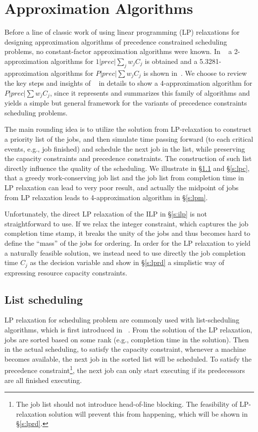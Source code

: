 \section{Approximation Algorithms} \label{s:lpr}

Before a line of classic work of using linear programming (LP) relaxations for designing approximation algorithms of precedence constrained scheduling problems, no constant-factor approximation algorithms were known. In ~\cite{schulz1996scheduling} a 2-approximation algorithms for $1|prec|\sum_j w_jC_j$ is obtained and a 5.3281-approximation algorithms for $P|prec|\sum w_jC_j$ is shown in~\cite{chakrabarti1996improved}. We choose to review the key steps and insights of ~\cite{queyranne2006approximation} in details to show a 4-approximation algorithm for $P|prec|\sum w_jC_j$, since it represents and summarizes this family of algorithms and yields a simple but general framework for the variants of precedence constraints scheduling problems.

The main rounding idea is to utilize the solution from LP-relaxation to construct a priority list of the jobs, and then simulate time passing forward (to each critical events, e.g., job finished) and schedule the next job in the list, while preserving the capacity constraints and precedence constraints. The construction of such list directly influence the quality of the scheduling. We illustrate in \S\ref{s:lst} and \S\ref{s:lpc}, that a greedy work-conserving job list and the job list from completion time in LP relaxation can lead to very poor result, and actually the midpoint of jobs from LP relaxation leads to 4-approximation algorithm in \S\ref{s:lpm}.

Unfortunately, the direct LP relaxation of the ILP in \S\ref{s:ilp} is not straightforward to use. If we relax the integer constraint, which captures the job completion time stamp, it breaks the unity of the jobs and thus becomes hard to define the ``mass'' of the jobs for ordering. In order for the LP relaxation to yield a naturally feasible solution, we instead need to use directly the job completion time $C_j$ as the decision variable and show in \S\ref{s:lprd} a simplistic way of expressing resource capacity constraints. 

\subsection{List scheduling} \label{s:lst}
LP relaxation for scheduling problem are commonly used with list-scheduling algorithms, which is first introduced in ~\cite{graham1966bounds}. From the solution of the LP relaxation, jobs are sorted based on some rank (e.g., completion time in the solution). Then in the actual scheduling, to satisfy the capacity constraint, whenever a machine becomes available, the next job in the sorted list will be scheduled. To satisfy the precedence constraint\footnote{The job list should not introduce head-of-line blocking. The feasibility of LP-relaxation solution will prevent this from happening, which will be shown in \S\ref{s:lprd}.}, the next job can only start executing if its predecessors are all finished executing. 

